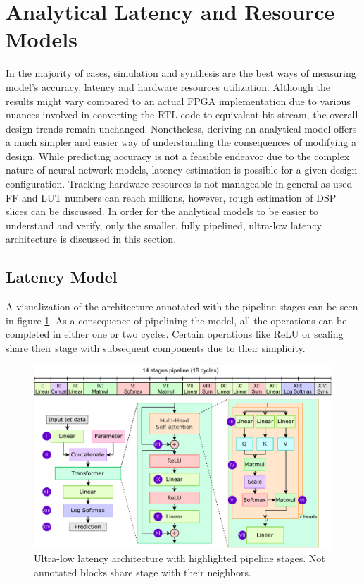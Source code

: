 \section{Analytical Latency and Resource Models}
In the majority of cases, simulation and synthesis are the best ways of measuring model's accuracy, latency and hardware resources utilization. Although the results might vary compared to an actual FPGA implementation due to various nuances involved in converting the RTL code to equivalent bit stream, the overall design trends remain unchanged. Nonetheless, deriving an analytical model offers a much simpler and easier way of understanding the consequences of modifying a design. While predicting accuracy is not a feasible endeavor due to the complex nature of neural network models, latency estimation is possible for a given design configuration. Tracking hardware resources is not manageable in general as used FF and LUT numbers can reach millions, however, rough estimation of DSP slices can be discussed. In order for the analytical models to be easier to understand and verify, only the smaller, fully pipelined, ultra-low latency architecture is discussed in this section.

\subsection{Latency Model}
A visualization of the architecture annotated with the pipeline stages can be seen in figure \ref{fig:pipeline-stages}. As a consequence of pipelining the model, all the operations can be completed in either one or two cycles. Certain operations like ReLU or scaling share their stage with subsequent components due to their simplicity.

\begin{figure}[hpt!]
  \centering
  \includegraphics[trim={0cm 0cm 0cm 0cm}, width=1.0\textwidth, center]{quantization/pipelining_stages.pdf}
  \caption{Ultra-low latency architecture with highlighted pipeline stages. Not annotated blocks share stage with their neighbors.}
  \label{fig:pipeline-stages}
\end{figure}


